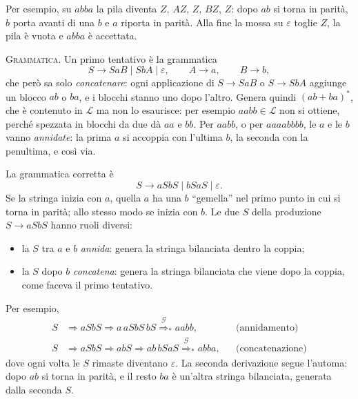 \documentclass[a4paper, 11pt, oneside]{book}
\theoremstyle{formale}
\begin{document}
    Per esempio, su $abba$ la pila diventa $Z$, $AZ$, $Z$, $BZ$, $Z$: dopo $ab$ si torna
    in parit\`a, $b$ porta avanti di una $b$ e $a$ riporta in parit\`a. Alla fine la
    mossa su $\varepsilon$ toglie $Z$, la pila \`e vuota e $abba$ \`e accettata.

    \textsc{Grammatica}. Un primo tentativo \`e la grammatica
    \begin{equation*}
        S \to SaB \mid SbA \mid \varepsilon, \qquad A \to a, \qquad B \to b,
    \end{equation*}
    che per\`o sa solo \emph{concatenare}: ogni applicazione di $S \to SaB$ o $S \to SbA$
    aggiunge un blocco $ab$ o $ba$, e i blocchi stanno uno dopo l'altro. Genera quindi
    $(ab + ba)^*$, che \`e contenuto in $\mathcal{L}$ ma non lo esaurisce: per esempio
    $aabb \in \mathcal{L}$ non si ottiene, perch\'e spezzata in blocchi da due d\`a $aa$
    e $bb$. Per $aabb$, o per $aaaabbbb$, le $a$ e le $b$ vanno \emph{annidate}: la prima
    $a$ si accoppia con l'ultima $b$, la seconda con la penultima, e cos\`i via.

    La grammatica corretta \`e
    \begin{equation*}
        S \to aSbS \mid bSaS \mid \varepsilon.
    \end{equation*}
    Se la stringa inizia con $a$, quella $a$ ha una $b$ ``gemella'' nel primo punto
    in cui si torna in parit\`a; allo stesso modo se inizia con $b$. Le due $S$ della
    produzione $S \to aSbS$ hanno ruoli diversi:
    \begin{itemize}
        \item la $S$ tra $a$ e $b$ \emph{annida}: genera la stringa bilanciata dentro la
            coppia;
        \item la $S$ dopo $b$ \emph{concatena}: genera la stringa bilanciata che viene
            dopo la coppia, come faceva il primo tentativo.
    \end{itemize}
    Per esempio,
    \begin{align*}
        S &\Rightarrow aSbS \Rightarrow a\,aSbS\,bS
            \overset{\mathcal{G}}{\Rightarrow}_* aabb,
            && \text{(annidamento)} \\
        S &\Rightarrow aSbS \Rightarrow abS \Rightarrow ab\,bSaS
            \overset{\mathcal{G}}{\Rightarrow}_* abba,
            && \text{(concatenazione)}
    \end{align*}
    dove ogni volta le $S$ rimaste diventano $\varepsilon$. La seconda derivazione segue
    l'automa: dopo $ab$ si torna in parit\`a, e il resto $ba$ \`e un'altra stringa
    bilanciata, generata dalla seconda $S$.
\end{document}
